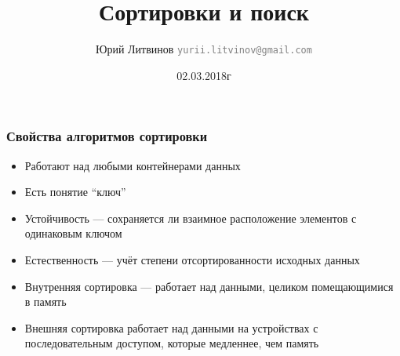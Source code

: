 \documentclass[xetex,mathserif,serif]{beamer}
\title{Сортировки и поиск}
\author[Юрий Литвинов]{Юрий Литвинов \newline \textcolor{gray}{\small\texttt{yurii.litvinov@gmail.com}}}
\date{02.03.2018г}
\begin{document}
	
	\frame{\titlepage}

	\begin{frame}
		\frametitle{Свойства алгоритмов сортировки}
		\begin{itemize}
			\item Работают над любыми контейнерами данных
			\item Есть понятие ``ключ''
			\item Устойчивость --- сохраняется ли взаимное расположение элементов с одинаковым ключом
			\item Естественность --- учёт степени отсортированности исходных данных
			\item Внутренняя сортировка --- работает над данными, целиком помещающимися в память
			\item Внешняя сортировка работает над данными на устройствах с последовательным доступом, которые медленнее, чем память
		\end{itemize}
	\end{frame}
\end{document}

